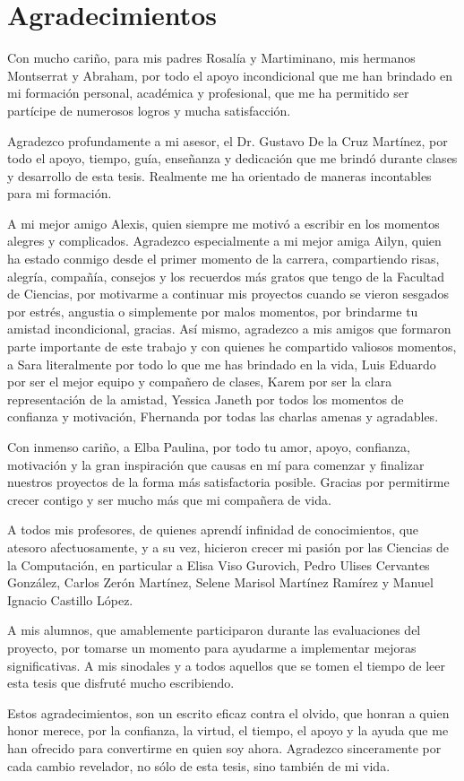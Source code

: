 \chapter*{Agradecimientos}

Con mucho cariño, para mis padres Rosalía y Martiminano, mis hermanos Montserrat y Abraham, por todo el apoyo incondicional que me han brindado en mi formación personal, académica y profesional, que me ha permitido ser partícipe de numerosos logros y mucha satisfacción.

Agradezco profundamente a mi asesor, el Dr. Gustavo De la Cruz Martínez, por todo el apoyo, tiempo, guía, enseñanza y dedicación que me brindó durante clases y desarrollo de esta tesis. Realmente me ha orientado de maneras incontables para mi formación.

A mi mejor amigo Alexis, quien siempre me motivó a escribir en los momentos alegres y complicados. Agradezco especialmente a mi mejor amiga Ailyn, quien ha estado conmigo desde el primer momento de la carrera, compartiendo risas, alegría, compañía, consejos y los recuerdos más gratos que tengo de la Facultad de Ciencias, por motivarme a continuar mis proyectos cuando se vieron sesgados por estrés, angustia o simplemente por malos momentos, por brindarme tu amistad incondicional, gracias. Así mismo, agradezco a mis amigos que formaron parte importante de este trabajo y con quienes he compartido valiosos momentos, a Sara literalmente por todo lo que me has brindado en la vida, Luis Eduardo por ser el mejor equipo y compañero de clases, Karem por ser la clara representación de la amistad, Yessica Janeth por todos los momentos de confianza y motivación, Fhernanda por todas las charlas amenas y agradables.

Con inmenso cariño, a Elba Paulina, por todo tu amor, apoyo, confianza, motivación y la gran inspiración que causas en mí para comenzar y finalizar nuestros proyectos de la forma más satisfactoria posible. Gracias por permitirme crecer contigo y ser mucho más que mi compañera de vida.

A todos mis profesores, de quienes aprendí infinidad de conocimientos, que atesoro afectuosamente, y a su vez, hicieron crecer mi pasión por las Ciencias de la Computación, en particular a Elisa Viso Gurovich, Pedro Ulises Cervantes González, Carlos Zerón Martínez, Selene Marisol Martínez Ramírez y Manuel Ignacio Castillo López.

A mis alumnos, que amablemente participaron durante las evaluaciones del proyecto, por tomarse un momento para ayudarme a implementar mejoras significativas. A mis sinodales y a todos aquellos que se tomen el tiempo de leer esta tesis que disfruté mucho escribiendo.

Estos agradecimientos, son un escrito eficaz contra el olvido, que honran a quien honor merece, por la confianza, la virtud, el tiempo, el apoyo y la ayuda que me han ofrecido para convertirme en quien soy ahora. Agradezco sinceramente por cada cambio revelador, no sólo de esta tesis, sino también de mi vida.
